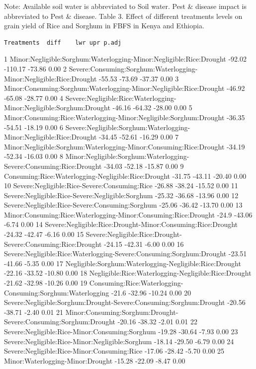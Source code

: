 \documentclass[12pt,oneside]{article}
\begin{document}
Note: Available soil water is abbreviated to Soil water. Pest \& disease impact is abbreviated to Pest \& disease.
Table 3. Effect of different treatments levels on grain yield of Rice and Sorghum in FBFS in Kenya and Ethiopia.

\begin{verbatim}
Treatments  diff    lwr upr p.adj
\end{verbatim}

1 Minor:Negligible:Sorghum:Waterlogging-Minor:Negligible:Rice:Drought -92.02 -110.17 -73.86 0.00
2 Severe:Consuming:Sorghum:Waterlogging-Minor:Negligible:Rice:Drought -55.53 -73.69 -37.37 0.00
3 Minor:Consuming:Sorghum:Waterlogging-Minor:Negligible:Rice:Drought -46.92 -65.08 -28.77 0.00
4 Severe:Negligible:Rice:Waterlogging-Minor:Negligible:Sorghum:Drought -46.16 -64.32 -28.00 0.00
5 Minor:Consuming:Rice:Waterlogging-Minor:Negligible:Sorghum:Drought -36.35 -54.51 -18.19 0.00
6 Severe:Negligible:Sorghum:Waterlogging-Minor:Negligible:Rice:Drought -34.45 -52.61 -16.29 0.00
7 Minor:Negligible:Sorghum:Waterlogging-Minor:Consuming:Rice:Drought -34.19 -52.34 -16.03 0.00
8 Minor:Negligible:Sorghum:Waterlogging-Severe:Consuming:Rice:Drought -34.03 -52.18 -15.87 0.00
9 Consuming:Rice:Waterlogging-Negligible:Rice:Drought -31.75 -43.11 -20.40 0.00
10 Severe:Negligible:Rice-Severe:Consuming:Rice -26.88 -38.24 -15.52 0.00
11 Severe:Negligible:Rice-Severe:Negligible:Sorghum -25.32 -36.68 -13.96 0.00
12 Severe:Negligible:Rice-Severe:Consuming:Sorghum -25.06 -36.42 -13.70 0.00
13 Minor:Consuming:Rice:Waterlogging-Minor:Consuming:Rice:Drought -24.9 -43.06 -6.74 0.00
14 Severe:Negligible:Rice:Drought-Minor:Consuming:Rice:Drought -24.32 -42.47 -6.16 0.00
15 Severe:Negligible:Rice:Drought-Severe:Consuming:Rice:Drought -24.15 -42.31 -6.00 0.00
16 Severe:Negligible:Rice:Waterlogging-Severe:Consuming:Sorghum:Drought -23.51 -41.66 -5.35 0.00
17 Negligible:Sorghum:Waterlogging-Negligible:Rice:Drought -22.16 -33.52 -10.80 0.00
18 Negligible:Rice:Waterlogging-Negligible:Rice:Drought -21.62 -32.98 -10.26 0.00
19 Consuming:Rice:Waterlogging-Consuming:Sorghum:Waterlogging -21.6 -32.96 -10.24 0.00
20 Severe:Negligible:Sorghum:Drought-Severe:Consuming:Sorghum:Drought -20.56 -38.71 -2.40 0.01
21 Minor:Consuming:Sorghum:Drought-Severe:Consuming:Sorghum:Drought -20.16 -38.32 -2.01 0.01
22 Severe:Negligible:Rice-Minor:Consuming:Sorghum -19.28 -30.64 -7.93 0.00
23 Severe:Negligible:Rice-Minor:Negligible:Sorghum -18.14 -29.50 -6.79 0.00
24 Severe:Negligible:Rice-Minor:Consuming:Rice -17.06 -28.42 -5.70 0.00
25 Minor:Waterlogging-Minor:Drought -15.28 -22.09 -8.47 0.00
\end{document}
